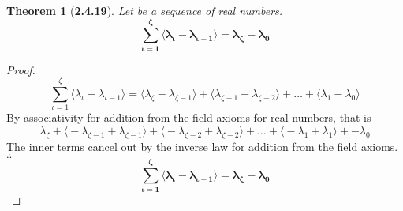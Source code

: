 \documentclass[a4paper, 12pt]{article}
\theoremstyle{plain}
\newtheorem*{theorem*}{Theorem}
\begin{document}
\begin{theorem*}[\textbf{2.4.19}]
    Let \bm{$\{\lambda_\zeta\}$} be a sequence of real numbers.
    \begin{equation*}
        \bm{
            \sum_{\iota=1}^\zeta \big \langle 
                \lambda_\iota - \lambda_{\iota-1}
            \big \rangle
                = 
            \lambda_\zeta - \lambda_0
        }
    \end{equation*}
\end{theorem*}
\begin{proof}
    \begin{equation*}
        \sum_{\iota=1}^\zeta \big \langle
            \lambda_\iota - \lambda_{\iota-1}
        \big \rangle
            =
        \big \langle \lambda_\zeta - \lambda_{\zeta-1} \big \rangle 
            + 
        \big \langle \lambda_{\zeta-1} - \lambda_{\zeta-2} \big \rangle 
            + 
        \dots 
            + 
        \big \langle \lambda_1 - \lambda_0 \big \rangle
    \end{equation*}
    By associativity for addition from the field axioms for real numbers, that is 
    \begin{equation*}
        \lambda_\zeta 
            + 
        \big \langle -\lambda_{\zeta-1} + \lambda_{\zeta-1} \big \rangle
            + 
        \big \langle -\lambda_{\zeta-2} + \lambda_{\zeta-2} \big \rangle
            + 
        \dots 
            + 
        \big \langle -\lambda_1 + \lambda_1 \big \rangle
            + 
        -\lambda_0
    \end{equation*}
    The inner terms cancel out 
    by the inverse law for addition from the field axioms. 
    $\therefore$
    \begin{equation*}
        \bm{
            \sum_{\iota=1}^\zeta \big \langle 
                \lambda_\iota - \lambda_{\iota-1}
            \big \rangle
                = 
            \lambda_\zeta - \lambda_0
        }
    \end{equation*} 
\color{lightgray} \end{proof}
\pagebreak
\end{document}
